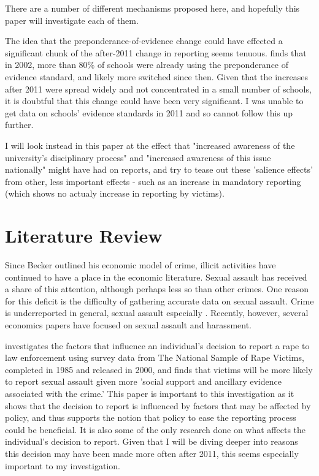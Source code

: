 \documentclass[AER]{AEA}
\begin{document}
There are a number of different mechanisms proposed here, and hopefully this paper will investigate each of them.

The idea that the preponderance-of-evidence change could have effected a significant chunk of the after-2011 change in reporting seems tenuous.  finds that in 2002, more than 80\% of schools were already using the preponderance of evidence standard, and likely more switched since then. Given that the increases after 2011 were spread widely and not concentrated in a small number of schools, it is doubtful that this change could have been very significant. I was unable to get data on schools' evidence standards in 2011 and so cannot follow this up further. 

I will look instead in this paper at the effect that "increased awareness of the university's disciplinary process" and "increased awareness  of this issue nationally" might have had on reports, and try to tease out these 'salience effects' from other, less important effects - such as an increase in mandatory reporting (which shows no actualy increase in reporting by victims).

\section{Literature Review}
Since Becker outlined his economic model of crime, illicit activities have continued to have a place in the economic literature. Sexual assault has received a share of this attention, although perhaps less so than other crimes. One reason for this deficit is the difficulty of gathering accurate data on sexual assault. Crime is underreported in general, sexual assault especially \cite{kilpatrick_drug-facilitated_2007} \cite{fisher_sexual_2000}. Recently, however, several economics papers have focused on sexual assault and harassment. 

 investigates the factors that influence an individual's decision to report a rape to law enforcement using survey data from The National Sample of Rape Victims, completed in 1985 and released in 2000, and finds that victims will be more likely to report sexual assault given more 'social support and ancillary evidence associated with the crime.' This paper is important to this investigation as it shows that the decision to report is influenced by factors that may be affected by policy, and thus supports the notion that policy to ease the reporting process could be beneficial. It is also some of the only research done on what affects the individual's decision to report. Given that I will be diving deeper into reasons this decision may have been made more often after 2011, this seems especially important to my investigation.
\end{document}
